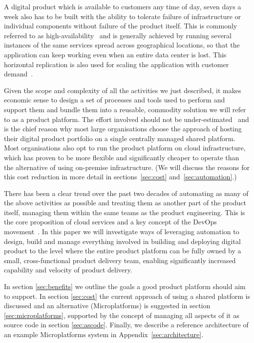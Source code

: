 \documentclass[reprint,amsmath,amssymb,aps]{revtex4-1}
\begin{document}
A digital product which is available to customers any time of day, seven days a week also has to be built with the ability to tolerate failure of infrastructure or individual components without failure of the product itself. This is commonly referred to as high-availability~\cite{HighAvai70:online} and is generally achieved by running several instances of the same services spread across geographical locations, so that the application can keep working even when an entire data center is lost. This horizontal replication is also used for scaling the application with customer demand~\cite{WhatIsAm85:online}.

Given the scope and complexity of all the activities we just described, it makes economic sense to design a set of processes and tools used to perform and support them and bundle them into a reusable, commodity solution we will refer to as a product platform. The effort involved should not be under-estimated~\cite{saaspdf24:online} and is the chief reason why most large organisations choose the approach of hosting their digital product portfolio on a single centrally managed shared platform. Most organisations also opt to run the product platform on cloud infrastructure, which has proven to be more flexible and significantly cheaper to operate than the alternative of using on-premise infrastructure. (We will discuss the reasons for this cost reduction in more detail in sections~\ref{sec:cost} and~\ref{sec:automation}.)

There has been a clear trend over the past two decades of automating as many of the above activities as possible and treating them as another part of the product itself, managing them within the same teams as the product engineering. This is the core proposition of cloud services and a key concept of the DevOps movement~\cite{DevOpsCu34:online}. In this paper we will investigate ways of leveraging automation to design, build and manage everything involved in building and deploying digital product to the level where the entire product platform can be fully owned by a small, cross-functional product delivery team, enabling significantly increased capability and velocity of product delivery.

In section \ref{sec:benefits} we outline the goals a good product platform should aim to support. In section \ref{sec:cost} the current approach of using a shared platform is discussed and an alternative (Microplatforms) is suggested in section \ref{sec:microplatforms}, supported by the concept of managing all aspects of it as source code in section \ref{sec:ascode}. Finally, we describe a reference architecture of an example Microplatforms system in Appendix~\ref{sec:architecture}.
\end{document}

